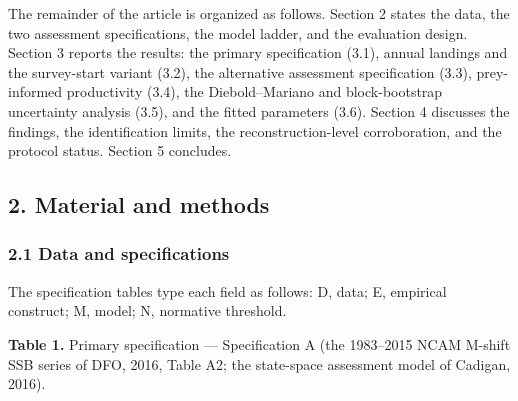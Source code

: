 \documentclass[11pt]{article}
\begin{document}
The remainder of the article is organized as follows. Section 2 states
the data, the two assessment specifications, the model ladder, and the
evaluation design. Section 3 reports the results: the primary
specification (3.1), annual landings and the survey-start variant (3.2),
the alternative assessment specification (3.3), prey-informed
productivity (3.4), the Diebold--Mariano and block-bootstrap
uncertainty analysis (3.5), and the fitted parameters (3.6).
Section 4 discusses the findings, the identification limits, the
reconstruction-level corroboration, and the protocol status.
Section 5 concludes.

\subsection{2. Material and methods}\label{material-and-methods}

\subsubsection{2.1 Data and
specifications}\label{data-and-specifications}

The specification tables type each field as follows: D, data; E,
empirical construct; M, model; N, normative threshold.

\textbf{Table 1.} Primary specification --- Specification A (the
1983--2015 NCAM M-shift SSB series of DFO, 2016, Table A2; the
state-space assessment model of Cadigan, 2016).
\end{document}
